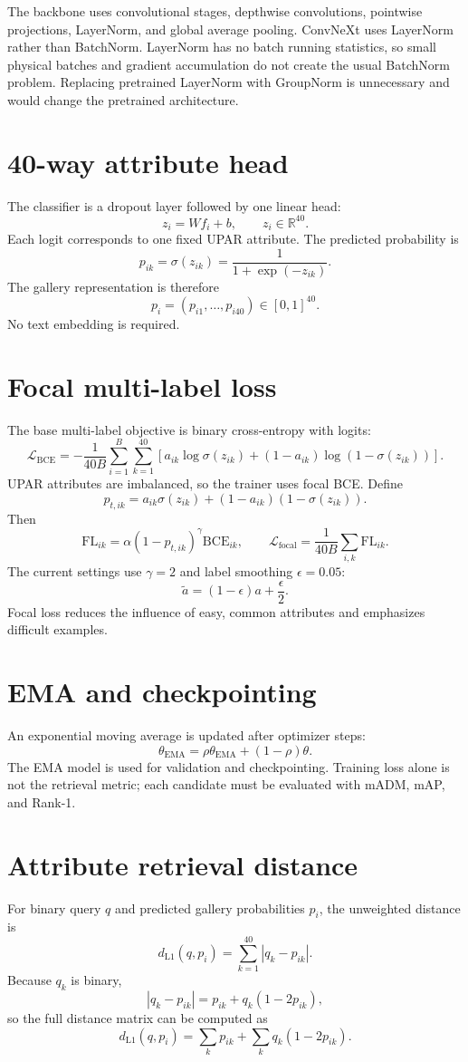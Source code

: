 \documentclass[11pt]{article}
\begin{document}
The backbone uses convolutional stages, depthwise convolutions, pointwise projections, LayerNorm, and global average pooling. ConvNeXt uses LayerNorm rather than BatchNorm. LayerNorm has no batch running statistics, so small physical batches and gradient accumulation do not create the usual BatchNorm problem. Replacing pretrained LayerNorm with GroupNorm is unnecessary and would change the pretrained architecture.

\section{40-way attribute head}
The classifier is a dropout layer followed by one linear head:
\[
z_i=Wf_i+b,\qquad z_i\in\mathbb{R}^{40}.
\]
Each logit corresponds to one fixed UPAR attribute. The predicted probability is
\[
p_{ik}=\sigma(z_{ik})=\frac{1}{1+\exp(-z_{ik})}.
\]
The gallery representation is therefore
\[
p_i=(p_{i1},\ldots,p_{i40})\in[0,1]^{40}.
\]
No text embedding is required.

\section{Focal multi-label loss}
The base multi-label objective is binary cross-entropy with logits:
\[
\mathcal{L}_{\mathrm{BCE}}=-\frac{1}{40B}\sum_{i=1}^{B}\sum_{k=1}^{40}
\left[a_{ik}\log\sigma(z_{ik})+(1-a_{ik})\log(1-\sigma(z_{ik}))\right].
\]
UPAR attributes are imbalanced, so the trainer uses focal BCE. Define
\[
p_{t,ik}=a_{ik}\sigma(z_{ik})+(1-a_{ik})(1-\sigma(z_{ik})).
\]
Then
\[
\mathrm{FL}_{ik}=\alpha(1-p_{t,ik})^\gamma\mathrm{BCE}_{ik},
\qquad
\mathcal{L}_{\mathrm{focal}}=\frac{1}{40B}\sum_{i,k}\mathrm{FL}_{ik}.
\]
The current settings use $\gamma=2$ and label smoothing $\epsilon=0.05$:
\[
\tilde a=(1-\epsilon)a+\frac{\epsilon}{2}.
\]
Focal loss reduces the influence of easy, common attributes and emphasizes difficult examples.

\section{EMA and checkpointing}
An exponential moving average is updated after optimizer steps:
\[
\theta_{\mathrm{EMA}}=\rho\theta_{\mathrm{EMA}}+(1-\rho)\theta.
\]
The EMA model is used for validation and checkpointing. Training loss alone is not the retrieval metric; each candidate must be evaluated with mADM, mAP, and Rank-1.

\section{Attribute retrieval distance}
For binary query $q$ and predicted gallery probabilities $p_i$, the unweighted distance is
\[
d_{\mathrm{L1}}(q,p_i)=\sum_{k=1}^{40}|q_k-p_{ik}|.
\]
Because $q_k$ is binary,
\[
|q_k-p_{ik}|=p_{ik}+q_k(1-2p_{ik}),
\]
so the full distance matrix can be computed as
\[
d_{\mathrm{L1}}(q,p_i)=\sum_kp_{ik}+\sum_kq_k(1-2p_{ik}).
\]
\end{document}
